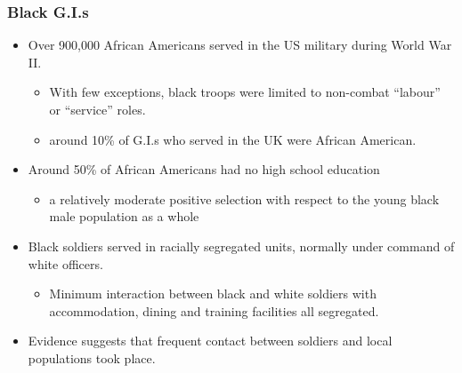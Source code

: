\documentclass[dvipdfmx,11pt]{beamer}
\begin{document}
\begin{frame}\frametitle{Black G.I.s}
  \begin{itemize}
    \item Over 900,000 African Americans served in the US military during World War II.
    \begin{itemize}
      \item With few exceptions, black troops were limited to non-combat “labour” or “service” roles.
      \item around 10\% of G.I.s who served in the UK were African American.
    \end{itemize}
    \item Around 50\% of African Americans had no high school education
    \begin{itemize}
      \item a relatively moderate positive selection with respect to the young black male population as a whole
    \end{itemize}
    \item Black soldiers served in racially segregated units, normally under command of white officers.
    \begin{itemize}
      \item Minimum interaction between black and white soldiers with accommodation, dining and training facilities all segregated.
    \end{itemize}
    \item Evidence suggests that frequent contact between soldiers and local populations took place.
  \end{itemize}
\end{frame}
\end{document}
